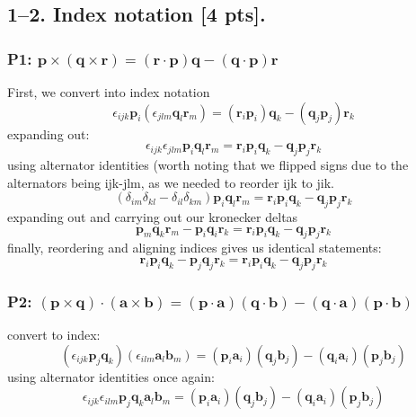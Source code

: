 \bigskip
\subsection*{1--2. \textbf{Index notation} [4 pts].} 

\subsubsection*{P1: $\bm{p} \times (\bm{q} \times \bm{r}) = (\bm{r} \cdot \bm{p}) \bm{q} - (\bm{q} \cdot \bm{p}) \bm{r}$}
First, we convert into index notation
\begin{equation}
    \epsilon_{ijk}\bm{p}_{i}(\epsilon_{jlm}\bm{q}_{l}\bm{r}_{m}) = (\bm{r}_i\bm{p}_i) \bm{q}_k - (\bm{q}_j\bm{p}_j) \bm{r}_k
\end{equation}
expanding out: 
\begin{equation}
    \epsilon_{ijk}\epsilon_{jlm}\bm{p}_{i}\bm{q}_{l}\bm{r}_{m} = \bm{r}_i\bm{p}_i \bm{q}_k - \bm{q}_j\bm{p}_j \bm{r}_k
\end{equation}
using alternator identities (worth noting that we flipped signs due to the alternators being ijk-jlm, as we needed to reorder ijk to jik.
\begin{equation}
    (\delta_{im}\delta_{kl}-\delta_{il}\delta_{km})\bm{p}_{i}\bm{q}_{l}\bm{r}_{m} = \bm{r}_i\bm{p}_i \bm{q}_k - \bm{q}_j\bm{p}_j \bm{r}_k
\end{equation}
expanding out and carrying out our kronecker deltas 
\begin{equation}
    \bm{p}_{m}\bm{q}_{k}\bm{r}_{m}-\bm{p}_{i}\bm{q}_{i}\bm{r}_{k} = \bm{r}_i\bm{p}_i \bm{q}_k - \bm{q}_j\bm{p}_j \bm{r}_k
\end{equation}
finally, reordering and aligning indices gives us identical statements:
\begin{equation}
    \boxed{\bm{r}_{i}\bm{p}_{i}\bm{q}_{k}-\bm{p}_{j}\bm{q}_{j}\bm{r}_{k} = \bm{r}_i\bm{p}_i \bm{q}_k - \bm{q}_j\bm{p}_j \bm{r}_k}
\end{equation}
\subsubsection*{P2: $(\bm{p} \times \bm{q}) \cdot (\bm{a} \times \bm{b}) = (\bm{p} \cdot \bm{a}) (\bm{q} \cdot \bm{b}) - (\bm{q} \cdot \bm{a})(\bm{p} \cdot \bm{b})$}
convert to index:
\begin{equation}
    (\epsilon_{ijk}\bm{p}_j\bm{q}_k)(\epsilon_{ilm}\bm{a}_l\bm{b}_m) = (\bm{p}_i\bm{a}_i) (\bm{q}_j\bm{b}_j) - (\bm{q}_i\bm{a}_i)(\bm{p}_j\bm{b}_j)
\end{equation}
using alternator identities once again:
\begin{equation}
    \epsilon_{ijk}\epsilon_{ilm}\bm{p}_j\bm{q}_k\bm{a}_l\bm{b}_m = (\bm{p}_i\bm{a}_i) (\bm{q}_j\bm{b}_j) - (\bm{q}_i\bm{a}_i)(\bm{p}_j\bm{b}_j)
\end{equation}


